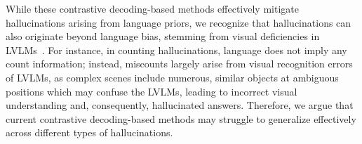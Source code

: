 While these contrastive decoding-based methods effectively mitigate hallucinations arising from language priors, we recognize that hallucinations can also originate beyond language bias, stemming from visual deficiencies in LVLMs~\citep{tong2024eyes}. For instance, in counting hallucinations, language does not imply any count information; instead, miscounts largely arise from visual recognition errors of LVLMs, as complex scenes include numerous, similar objects at ambiguous positions which may confuse the LVLMs, leading to incorrect visual understanding and, consequently, hallucinated answers. Therefore, we argue that current contrastive decoding-based methods may struggle to generalize effectively across different types of hallucinations.



















